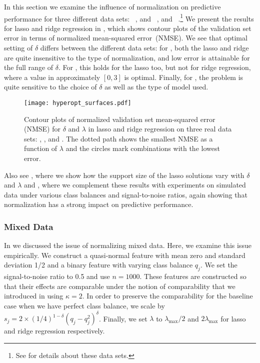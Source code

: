 In this section we examine the influence of normalization on predictive performance for
three different data sets: ~\citep{rhee2006}, and
~\citep{chen2004}, and
~\citep{hirst1994,king1995}.\footnote{See  for
  details about these data sets.} We present the results for lasso and ridge regression in
, which shows contour plots of the validation set error in
terms of normalized mean-squared error~(NMSE). We see that optimal setting of \(\delta\)
differs between the different data sets: for , both the lasso and ridge
are quite insensitive to the type of normalization, and low error is attainable for the
full range of \(\delta\). For , this holds for the lasso too, but not for
ridge regression, where a value in approximately \([0,3]\) is optimal. Finally, for
, the problem is quite sensitive to the choice of \(\delta\) as well as the
type of model used.

\begin{figure}[htpb]
  \centering
  \texttt{[image: hyperopt\_surfaces.pdf]}
  \caption{%
    Contour plots of normalized validation set mean-squared error (NMSE) for
    \(\delta\) and \(\lambda\) in lasso and ridge regression on three real data
    sets: , , and . The dotted
    path shows the smallest NMSE as a function of \(\lambda\) and the circles
    mark combinations with the lowest error.
  }
  \label{fig:hyperopt-contours}
\end{figure}

Also see , where we show how the support size of
the lasso solutions vary with \(\delta\) and \(\lambda\) and
, where we complement these results with
experiments on simulated data under various class balances and signal-to-noise ratios,
again showing that normalization has a strong impact on predictive performance.

\subsubsection{Mixed Data}\label{sec:experiments-mixed-data}

In  we discussed the issue of normalizing mixed data. Here, we examine
this issue empirically. We construct a quasi-normal feature with mean zero and standard
deviation 1/2 and a binary feature with varying class balance \(q_j\). We set the
signal-to-noise ratio to 0.5 and use \(n = \num{1000}\). These features are constructed so
that their effects are comparable under the notion of comparability that we introduced in
 using \(\kappa = 2\). In order to preserve the comparability for the
baseline case when we have perfect class balance, we scale by \(s_j = 2 \times
(1/4)^{1-\delta}(q_j-q_j^2)^\delta\). Finally, we set \(\lambda\) to
\(\lambda_\text{max}/2\) and \(2\lambda_\text{max}\) for lasso and ridge regression
respectively.

